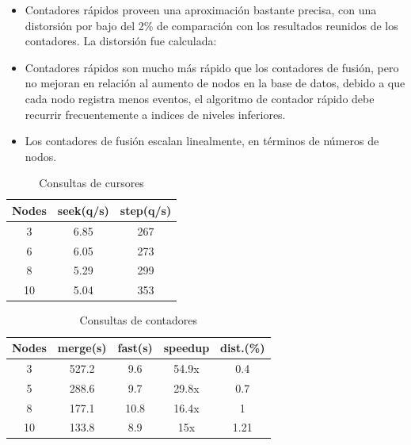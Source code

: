 \documentclass[12pt,legalpaper]{report}
\begin{document}
\begin{itemize}
		\begin{itemize}
			\item Contadores rápidos proveen una aproximación bastante precisa, con una distorsión por bajo del 2\% de comparación con los resultados reunidos de los contadores. La distorsión fue calculada: 

			\item Contadores rápidos son mucho más rápido que los contadores de fusión, pero no mejoran en relación al aumento de nodos en la base de datos, debido a que cada nodo registra menos eventos, el algoritmo de contador rápido debe recurrir frecuentemente a indices de niveles inferiores.
 
			\item Los contadores de fusión escalan linealmente, en términos de números de nodos.
		\end{itemize}
\end{itemize}

\begin{table}[!h]
\begin{center}
\begin{tabular}{| c | c | c |}
\hline
\rowcolor[gray]{0.9}Nodes & seek(q/s) & step(q/s)\\
\hline
3 & 6.85 & 267\\
\hline
6 & 6.05 & 273\\
\hline
8 & 5.29 & 299\\
\hline
10 & 5.04 & 353\\
\hline
\end{tabular}
\caption{Consultas de cursores}
\label{cursorQueries}
\end{center}
\end{table}


\begin{table}[!h]
\begin{center}
\begin{tabular}{| c | c | c | c | c |}
\hline
\rowcolor[gray]{0.9}Nodes & merge(s) & fast(s) & speedup & dist.(\%)\\
\hline
3 & 527.2 & 9.6 & 54.9x & 0.4\\
\hline
5 & 288.6 & 9.7 & 29.8x & 0.7\\
\hline
8 & 177.1 & 10.8 & 16.4x & 1\\
\hline
10 & 133.8 & 8.9 & 15x & 1.21\\
\hline
\end{tabular}
\caption{Consultas de contadores}
\label{countQueries}
\end{center}
\end{table}
\end{document}

